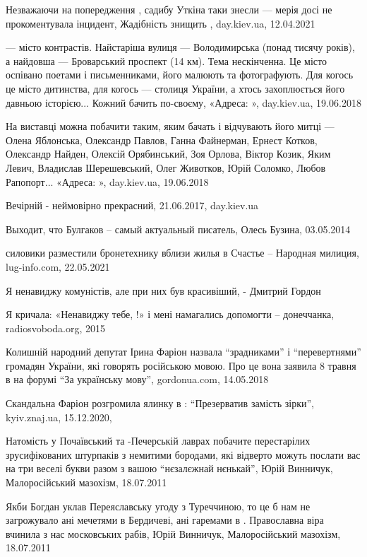 Незважаючи на попередження , садибу Уткіна таки знесли — мерія досі не
прокоментувала інцидент, Жадібність знищить , day.kiev.ua, 12.04.2021

 — місто контрастів. Найстаріша вулиця — Володимирська (понад тисячу
років), а найдовша — Броварський проспект (14 км). Тема  нескінченна. Це
місто оспівано поетами і письменниками, його малюють та фотографують. Для
когось це місто дитинства, для когось — столиця України, а хтось захоплюється
його давньою історією...  Кожний бачить  по-своєму, 
«Адреса: », day.kiev.ua, 19.06.2018

На виставці можна побачити  таким, яким бачать і відчувають його митці
— Олена Яблонська, Олександр Павлов, Ганна Файнерман, Ернест Котков, Олександр
Найден, Олексій Орябинський, Зоя Орлова, Віктор Козик, Яким Левич, Владислав
Шерешевський, Олег Животков, Юрій Соломко, Любов Рапопорт...  «Адреса:
», day.kiev.ua, 19.06.2018

Вечірній  - неймовірно прекрасний, 21.06.2017, day.kiev.ua

Выходит, что Булгаков – самый актуальный  писатель, Олесь
Бузина, 03.05.2014

 силовики разместили бронетехнику вблизи жилья в Счастье – Народная
милиция, lug-info.com, 22.05.2021

Я ненавиджу комуністів, але при них  був красивіший, - Дмитрий Гордон

Я кричала: «Ненавиджу тебе, !» і мені намагались допомогти –
донеччанка, radiosvoboda.org, 2015

Колишній народний депутат Ірина Фаріон назвала \enquote{зрадниками} і
\enquote{перевертнями} громадян України, які говорять російською мовою. Про це
вона заявила 8 травня в  на форумі \enquote{За українську мову},
gordonua.com, 14.05.2018

Скандальна Фаріон розгромила ялинку в : \enquote{Презерватив замість
зірки}, kyiv.znaj.ua, 15.12.2020,

Натомість у Почаївський та -Печерській лаврах побачите перестарілих
зрусифікованих штурпаків з немитими бородами, які відверто можуть послати вас
на три веселі букви разом з вашою ``нєзалєжнай нєнькай'', Юрій Винничук,
Малоросійський мазохізм, 18.07.2011

Якби Богдан уклав Переяславську угоду з Туреччиною, то це б нам не загрожувало
ані мечетями в Бердичеві, ані гаремами в . Православна віра вчинила з
нас московських рабів, Юрій Винничук, Малоросійський мазохізм, 18.07.2011


